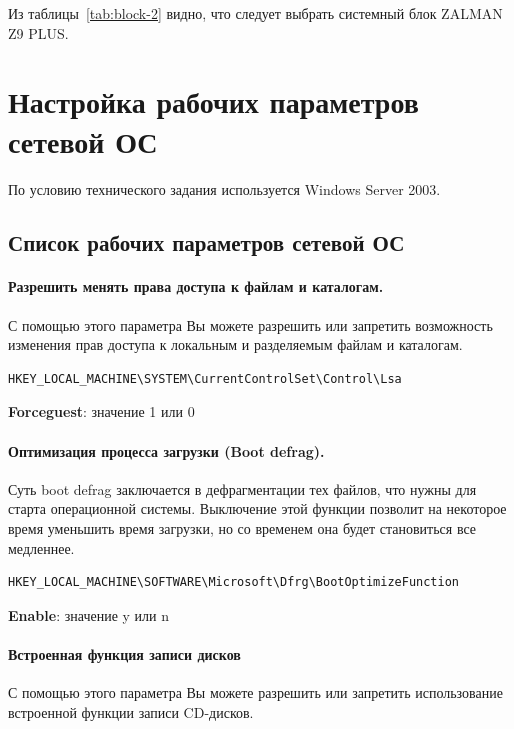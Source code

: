 \documentclass[russian,utf8,emptystyle]{eskdtext}
\begin{document}
Из таблицы~\ref{tab:block-2} видно, что следует выбрать системный блок ZALMAN Z9 PLUS.

\clearpage
\section{Настройка рабочих параметров сетевой ОС}

По условию технического задания используется Windows Server 2003.

\subsection{Список рабочих параметров сетевой ОС}

\paragraph{Разрешить менять права доступа к файлам и каталогам.}

С помощью этого параметра Вы можете разрешить или запретить возможность изменения прав доступа к локальным и разделяемым файлам и каталогам.

\begin{verbatim}
HKEY_LOCAL_MACHINE\SYSTEM\CurrentControlSet\Control\Lsa
\end{verbatim}

\textbf{Forceguest}: значение 1 или 0


\paragraph{Оптимизация процесса загрузки (Boot defrag).}

Суть boot defrag заключается в дефрагментации тех файлов, что нужны для старта операционной системы. Выключение этой функции позволит на некоторое время уменьшить время загрузки, но со временем она будет становиться все медленнее.

\begin{verbatim}
HKEY_LOCAL_MACHINE\SOFTWARE\Microsoft\Dfrg\BootOptimizeFunction
\end{verbatim}

\textbf{Enable}: значение y или n	


\paragraph{Встроенная функция записи дисков}

С помощью этого параметра Вы можете разрешить или запретить использование встроенной функции записи CD-дисков.
\end{document}
